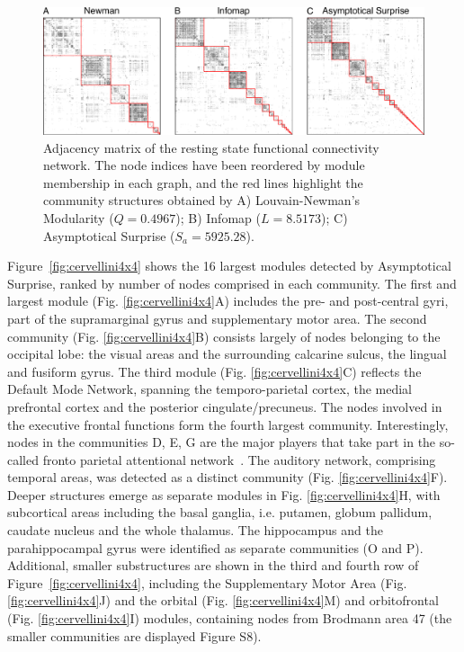 \begin{figure}[htb!]
\includegraphics[width=\textwidth]{images/pacopaperfigure6.pdf}
\caption{Adjacency matrix of the resting state functional connectivity network. The node indices have been reordered by module membership in each graph, and the red lines highlight the community structures obtained by A) Louvain-Newman's Modularity  ($Q=0.4967$); B)  Infomap ($L=8.5173$); C) Asymptotical Surprise ($S_a=5925.28$).}
\label{fig:partitioncomparison}
\end{figure}


Figure~\ref{fig:cervellini4x4} shows the 16 largest modules detected by Asymptotical Surprise, ranked by number of nodes comprised in each community. 
The first and largest module (Fig. \ref{fig:cervellini4x4}A) includes the pre- and post-central gyri, part of the supramarginal gyrus and supplementary motor area.
The second community (Fig. \ref{fig:cervellini4x4}B) consists largely of nodes belonging to the occipital lobe: the visual areas and the surrounding calcarine sulcus, the lingual and fusiform gyrus.
The third module (Fig. \ref{fig:cervellini4x4}C) reflects the Default Mode Network, spanning the temporo-parietal cortex, the medial prefrontal cortex and the posterior cingulate/precuneus.
The nodes involved in the executive frontal functions form the fourth largest community.
Interestingly, nodes in the communities D, E, G are the major players that take part in the so-called fronto parietal attentional network~\cite{markett2014}.
The auditory network, comprising temporal areas, was detected as a distinct community (Fig. \ref{fig:cervellini4x4}F).
Deeper structures emerge as separate modules in Fig. \ref{fig:cervellini4x4}H, with subcortical areas including the basal ganglia, i.e. putamen, globum pallidum, caudate nucleus and the whole thalamus.
The hippocampus and the parahippocampal gyrus were identified as separate communities (O and P).
Additional, smaller substructures are shown in the third and fourth row of Figure~\ref{fig:cervellini4x4}, including the Supplementary Motor Area (Fig. \ref{fig:cervellini4x4}J) and the orbital (Fig. \ref{fig:cervellini4x4}M) and orbitofrontal (Fig. \ref{fig:cervellini4x4}I) modules, containing nodes from Brodmann area 47 (the smaller communities are displayed Figure S8).

